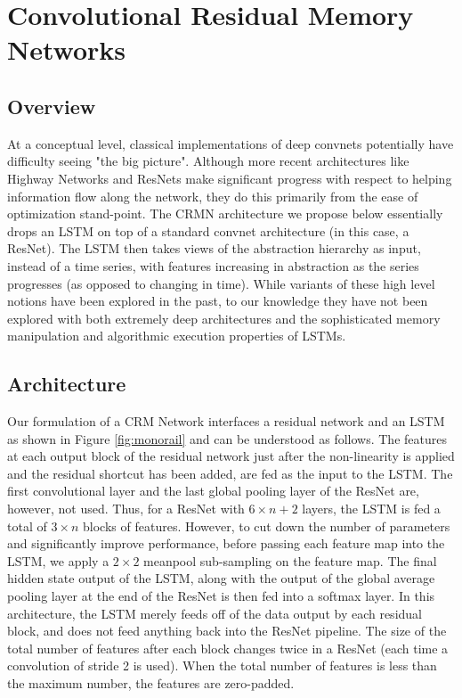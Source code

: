 \documentclass{article}
\begin{document}
\section{Convolutional Residual Memory Networks}
\subsection{Overview}
At a conceptual level, classical implementations of deep convnets potentially have difficulty seeing "the big picture". Although more recent architectures like Highway Networks and ResNets make significant progress with respect to helping information flow along the network, they do this primarily from the ease of optimization stand-point. The CRMN architecture we propose below essentially drops an LSTM on top of a standard convnet architecture (in this case, a ResNet). The LSTM then takes views of the abstraction hierarchy as input, instead of a time series, with features increasing in abstraction as the series progresses (as opposed to changing in time). While variants of these high level notions have been explored in the past, to our knowledge they have not been explored with both extremely deep architectures and the sophisticated memory manipulation and algorithmic execution properties of LSTMs.

\subsection{Architecture}
\label{sec:arch}
Our formulation of a CRM Network interfaces a residual network and an LSTM as shown in Figure \ref{fig:monorail} and can be understood as follows. The features at each output block of the residual network just after the non-linearity is applied and the residual shortcut has been added, are fed as the input to the LSTM. The first convolutional layer and the last global pooling
layer of the ResNet are, however, not used. Thus, for a ResNet with \(6\times{n}+2\) layers, the LSTM is fed a total of \(3\times{n}\) blocks of features. %
However, to cut down the number of parameters and significantly improve performance, before passing each feature map into the LSTM, we apply a \(2\times{2}\) meanpool sub-sampling on the feature map. The final hidden state output of the LSTM, along with the output of the global average pooling layer at the end of the ResNet %
is then fed into a softmax layer. In this architecture, the LSTM merely feeds off of the data output by each residual block, and does not feed anything back into the ResNet pipeline. The size of the total number of features after each block changes twice in a ResNet (each time a convolution of stride 2 is used). When the total number of features is less than the maximum number, the features are zero-padded.
\end{document}
